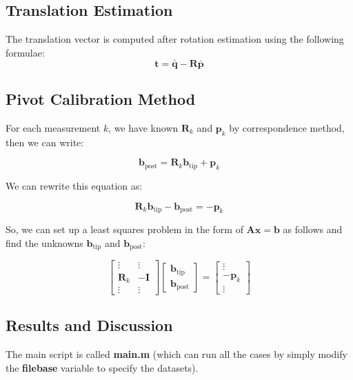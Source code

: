 \documentclass[english,10pt,a4paper]{book}
\begin{document}
    \subsection*{Translation Estimation}
    
    The translation vector is computed after rotation estimation using the following formulae: 
    \[
    \mathbf{t} = \bar{\mathbf{q}} - \mathbf{R} \bar{\mathbf{p}}
    \]
    
    \subsection{Pivot Calibration Method}\label{pc}
    For each measurement \( k \), we have known \( \mathbf{R}_k \) and \( \mathbf{p}_k \) by correspondence method, then we can write:
    
    \[
    \mathbf{b}_{\text{post}} = \mathbf{R}_k \mathbf{b}_{\text{tip}} + \mathbf{p}_k
    \]
    
    We can rewrite this equation as:
    
    \[
    \mathbf{R}_k \mathbf{b}_{\text{tip}} - \mathbf{b}_{\text{post}} = -\mathbf{p}_k
    \]
    
    So, we can set up a least squares problem in the form of \( \mathbf{A}\mathbf{x} = \mathbf{b} \) as follows and find the unknowns \( \mathbf{b}_{\text{tip}} \) and \( \mathbf{b}_{\text{post}} \): \cite{Lynch_Park_2017}
    
    \[
    \begin{bmatrix}
    	\vdots & \vdots \\
    	\mathbf{R}_k & -\mathbf{I} \\
    	\vdots & \vdots
    \end{bmatrix}
    \begin{bmatrix}
    	\mathbf{b}_{\text{tip}} \\
    	\mathbf{b}_{\text{post}}
    \end{bmatrix}
    =
    \begin{bmatrix}
    	\vdots \\
    	-\mathbf{p}_k \\
    	\vdots
    \end{bmatrix}
    \]
    \subsection{Results and Discussion}
    The main script is called \textbf{main.m} (which can run all the cases by simply modify the \textbf{filebase} variable to specify the datasets).
    
\end{document}
